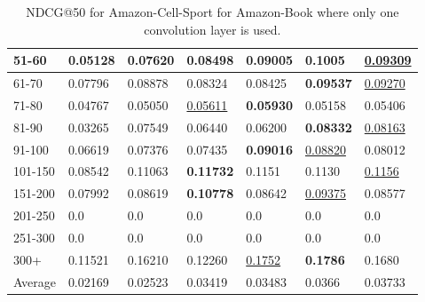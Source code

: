 \begin{table*}[]
\begin{tabular}{|l|l|l|l|l|l|l|}
        51-60   & 0.05128                        & 0.07620                        & 0.08498                        & 0.09005                        & \textbf{0.1005}                & \underline{0.09309}            \\ \hline
        61-70   & 0.07796                        & 0.08878                        & 0.08324                        & 0.08425                        & \textbf{0.09537}               & \underline{0.09270}            \\ \hline
        71-80   & 0.04767                        & 0.05050                        & \underline{0.05611}            & \textbf{0.05930}               & 0.05158                        & 0.05406                        \\ \hline
        81-90   & 0.03265                        & 0.07549                        & 0.06440                        & 0.06200                        & \textbf{0.08332}               & \underline{0.08163}            \\ \hline
        91-100  & 0.06619                        & 0.07376                        & 0.07435                        & \textbf{0.09016}               & \underline{0.08820}            & 0.08012                        \\ \hline
        101-150 & 0.08542                        & 0.11063                        & \textbf{0.11732}               & 0.1151                         & 0.1130                         & \underline{0.1156}             \\ \hline
        151-200 & 0.07992                        & 0.08619                        & \textbf{0.10778}               & 0.08642                        & \underline{0.09375}            & 0.08577                        \\ \hline
        201-250 & 0.0                            & 0.0                            & 0.0                            & 0.0                            & 0.0                            & 0.0                            \\ \hline
        251-300 & 0.0                            & 0.0                            & 0.0                            & 0.0                            & 0.0                            & 0.0                            \\ \hline
        300+    & 0.11521                        & 0.16210                        & 0.12260                        & \underline{0.1752}             & \textbf{0.1786}                & 0.1680                         \\ \hline
        Average & 0.02169                        & 0.02523                        & 0.03419                        & 0.03483                        & 0.0366                         & 0.03733                        \\ \hline
    \end{tabular}
    \caption{NDCG@50 for Amazon-Cell-Sport for Amazon-Book where only one convolution layer is used.}
    \label{tab:Amazon-Cell-Sport-ndcg-evaluation}
\end{table*}
